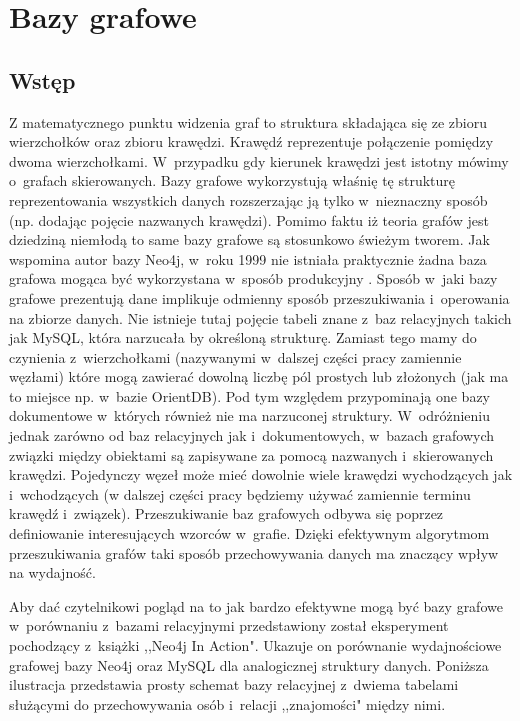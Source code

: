 \documentclass[brudnopis]{xmgr}
\begin{document}
\chapter{Bazy grafowe}

\section{Wstęp}

Z matematycznego punktu widzenia\cite{Szepietowski:2010:MD} graf to struktura składająca się ze zbioru wierzchołków oraz zbioru krawędzi. Krawędź reprezentuje połączenie pomiędzy dwoma wierzchołkami. W~przypadku gdy kierunek krawędzi jest istotny mówimy o~grafach skierowanych. Bazy grafowe wykorzystują właśnię tę strukturę reprezentowania wszystkich danych rozszerzając ją tylko w~nieznaczny sposób (np. dodając pojęcie nazwanych krawędzi). Pomimo faktu iż teoria grafów jest dziedziną niemłodą to same bazy grafowe są stosunkowo świeżym tworem. Jak wspomina autor bazy Neo4j, w~roku 1999 nie istniała praktycznie żadna baza grafowa mogąca być wykorzystana w~sposób produkcyjny \cite{Robinson:2013:GD}. Sposób w~jaki bazy grafowe prezentują dane implikuje odmienny sposób przeszukiwania i~operowania na zbiorze danych. Nie istnieje tutaj pojęcie tabeli znane z~baz relacyjnych takich jak MySQL, która narzucała by określoną strukturę. Zamiast tego mamy do czynienia z~wierzchołkami (nazywanymi w~dalszej części pracy zamiennie węzłami) które mogą zawierać dowolną liczbę pól prostych lub złożonych (jak ma to miejsce np. w~bazie OrientDB). Pod tym względem przypominają one bazy dokumentowe w~których również nie ma narzuconej struktury. W~odróżnieniu jednak zarówno od baz relacyjnych jak i~dokumentowych, w~bazach grafowych związki między obiektami są zapisywane za pomocą nazwanych i~skierowanych krawędzi. Pojedynczy węzeł może mieć dowolnie wiele krawędzi wychodzących jak i~wchodzących (w dalszej części pracy będziemy używać zamiennie terminu krawędź i~związek). Przeszukiwanie baz grafowych odbywa się poprzez definiowanie interesujących wzorców w~grafie. Dzięki efektywnym algorytmom przeszukiwania grafów taki sposób przechowywania danych ma znaczący wpływ na wydajność.

Aby dać czytelnikowi pogląd na to jak bardzo efektywne mogą być bazy grafowe w~porównaniu z~bazami relacyjnymi przedstawiony został eksperyment pochodzący z~książki ,,Neo4j In Action"\cite{neo4jinaction}. Ukazuje on porównanie wydajnościowe grafowej bazy Neo4j oraz MySQL dla analogicznej struktury danych. Poniższa ilustracja przedstawia prosty schemat bazy relacyjnej z~dwiema tabelami służącymi do przechowywania osób i~relacji ,,znajomości" między nimi.
\end{document}
